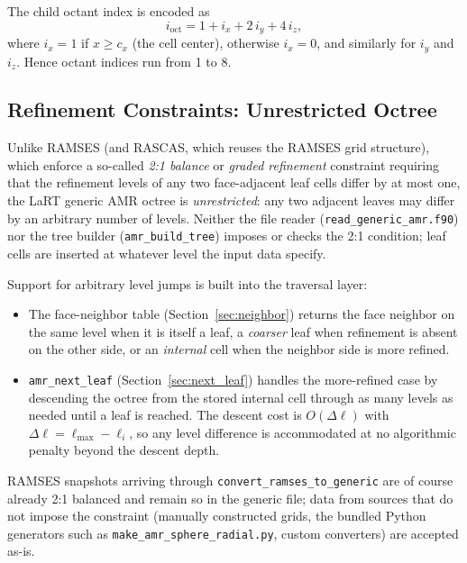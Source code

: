 \documentclass[english,a4paper]{my_memo}
\begin{document}
The child octant index is encoded as
\begin{equation}
  i_\mathrm{oct} = 1 + i_x + 2\,i_y + 4\,i_z,
\end{equation}
where $i_x = 1$ if $x \ge c_x$ (the cell center), otherwise $i_x = 0$, and
similarly for $i_y$ and $i_z$.  Hence octant indices run from 1 to 8.

\subsection{Refinement Constraints: Unrestricted Octree}
\label{sec:refinement_constraints}

Unlike RAMSES (and RASCAS, which reuses the RAMSES grid structure), which
enforce a so-called \emph{2:1 balance} or \emph{graded refinement}
constraint requiring that the refinement levels of any two face-adjacent
leaf cells differ by at most one, the LaRT generic AMR octree is
\emph{unrestricted}: any two adjacent leaves may differ by an arbitrary
number of levels.  Neither the file reader
(\texttt{read\_generic\_amr.f90}) nor the tree builder
(\texttt{amr\_build\_tree}) imposes or checks the 2:1 condition; leaf
cells are inserted at whatever level the input data specify.

Support for arbitrary level jumps is built into the traversal layer:
\begin{itemize}
  \item The face-neighbor table (Section~\ref{sec:neighbor}) returns the
        face neighbor on the same level when it is itself a leaf, a
        \emph{coarser} leaf when refinement is absent on the other side,
        or an \emph{internal} cell when the neighbor side is more refined.
  \item \texttt{amr\_next\_leaf} (Section~\ref{sec:next_leaf}) handles the
        more-refined case by descending the octree from the stored
        internal cell through as many levels as needed until a leaf is
        reached.  The descent cost is $O(\Delta\ell)$ with
        $\Delta\ell = \ell_\mathrm{max} - \ell_i$, so any level difference
        is accommodated at no algorithmic penalty beyond the descent
        depth.
\end{itemize}

RAMSES snapshots arriving through \texttt{convert\_ramses\_to\_generic}
are of course already 2:1 balanced and remain so in the generic file;
data from sources that do not impose the constraint (manually constructed
grids, the bundled Python generators such as
\texttt{make\_amr\_sphere\_radial.py}, custom converters) are accepted
as-is.
\end{document}
